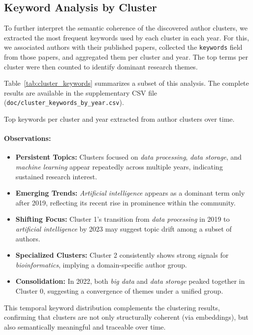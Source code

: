 \documentclass[10pt,a4paper]{article}
\begin{document}
\subsection{Keyword Analysis by Cluster}

To further interpret the semantic coherence of the discovered author clusters, we extracted the most frequent keywords used by each cluster in each year. For this, we associated authors with their published papers, collected the \texttt{keywords} field from those papers, and aggregated them per cluster and year. The top terms per cluster were then counted to identify dominant research themes.

Table~\ref{tab:cluster_keywords} summarizes a subset of this analysis. The complete results are available in the supplementary CSV file (\texttt{doc/cluster\_keywords\_by\_year.csv}).

\begin{table}[H]
\centering
\scriptsize
{}
\caption{Top keywords per cluster and year extracted from author clusters over time.}
\label{tab:cluster_keywords_csv}
\end{table}

\paragraph{Observations:}

\begin{itemize}
    \item \textbf{Persistent Topics:} Clusters focused on \textit{data processing}, \textit{data storage}, and \textit{machine learning} appear repeatedly across multiple years, indicating sustained research interest.
    
    \item \textbf{Emerging Trends:} \textit{Artificial intelligence} appears as a dominant term only after 2019, reflecting its recent rise in prominence within the community.

    \item \textbf{Shifting Focus:} Cluster 1's transition from \textit{data processing} in 2019 to \textit{artificial intelligence} by 2023 may suggest topic drift among a subset of authors.

    \item \textbf{Specialized Clusters:} Cluster 2 consistently shows strong signals for \textit{bioinformatics}, implying a domain-specific author group.

    \item \textbf{Consolidation:} In 2022, both \textit{big data} and \textit{data storage} peaked together in Cluster 0, suggesting a convergence of themes under a unified group.
\end{itemize}

This temporal keyword distribution complements the clustering results, confirming that clusters are not only structurally coherent (via embeddings), but also semantically meaningful and traceable over time.
\end{document}
